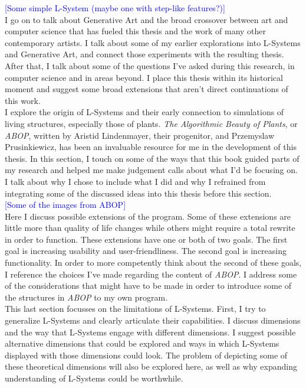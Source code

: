 \documentclass[12pt,twoside]{reedthesis}
\begin{document}
	\textcolor{blue}{[Some simple L-System (maybe one with step-like features?)]}\\
	
	I go on to talk about Generative Art and the broad crossover between art and computer science that has fueled this thesis and the work of many other contemporary artists. I talk about some of my earlier explorations into L-Systems and Generative Art, and connect those experiments with the resulting thesis. After that, I talk about some of the questions I've asked during this research, in computer science and in areas beyond. I place this thesis within its historical moment and suggest some broad extensions that aren't direct continuations of this work.\\
	
	I explore the origin of L-Systems and their early connection to simulations of living structures, especially those of plants. \textit{The Algorithmic Beauty of Plants}, or \textit{ABOP}, written by Aristid Lindenmayer, their progenitor, and Przemyslaw Prusinkiewicz, has been an invaluable resource for me in the development of this thesis. In this section, I touch on some of the ways that this book guided parts of my research and helped me make judgement calls about what I'd be focusing on. I talk about why I chose to include what I did and why I refrained from integrating some of the discussed ideas into this thesis before this section.\\
	
	\textcolor{blue}{[Some of the images from ABOP]}\\
	
	Here I discuss possible extensions of the program. Some of these extensions are little more than quality of life changes while others might require a total rewrite in order to function. These extensions have one or both of two goals. The first goal is increasing usability and user-friendliness. The second goal is increasing functionality. In order to more competently think about the second of these goals, I reference the choices I've made regarding the content of \textit{ABOP}. I address some of the considerations that might have to be made in order to introduce some of the structures in \textit{ABOP} to my own program.\\
	
	This last section focusses on the limitations of L-Systems. First, I try to generalize L-Systems and clearly articulate their capabilities. I discuss dimensions and the way that L-Systems engage with different dimensions. I suggest possible alternative dimensions that could be explored and ways in which L-Systems displayed with those dimensions could look. The problem of depicting some of these theoretical dimensions will also be explored here, as well as why expanding understanding of L-Systems could be worthwhile.\\
	
\end{document}
